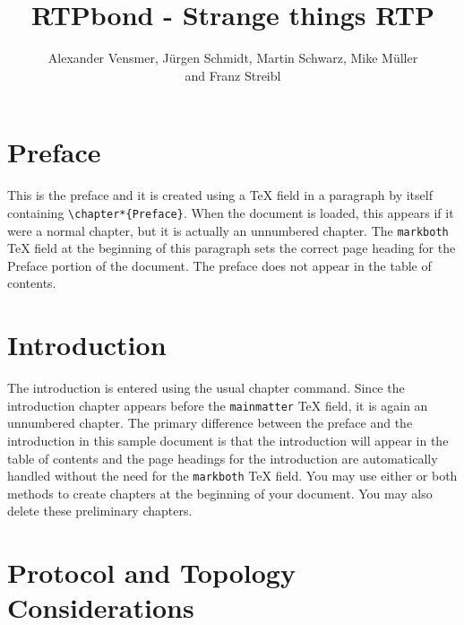 \documentclass[a4paper]{book}%
\begin{document}
\frontmatter
\title{RTPbond - Strange things RTP}
\author{Alexander Vensmer, J\"urgen Schmidt, Martin Schwarz, Mike M\"uller \\ and Franz Streibl}
\maketitle
\tableofcontents

\chapter*{Preface}

This is the preface and it is created using a TeX field in a
paragraph by itself containing \verb|\chapter*{Preface}|. When the
document is loaded, this appears if it were a normal chapter, but
it is actually an unnumbered chapter. The \verb|markboth| TeX
field at the beginning of this paragraph sets the correct page
heading for the Preface portion of the document. The preface does
not appear in the table of contents.

\chapter{Introduction}

The introduction is entered using the usual chapter command. Since
the introduction chapter appears before the \verb|mainmatter| TeX
field, it is again an unnumbered chapter. The primary difference
between the preface and the introduction in this sample document
is that the introduction will appear in the table of contents and
the page headings for the introduction are automatically handled
without the need for the \verb|markboth| TeX field. You may use
either or both methods to create chapters at the beginning of your
document. You may also delete these preliminary chapters.

\mainmatter
\chapter{Protocol and Topology Considerations}
\end{document}
